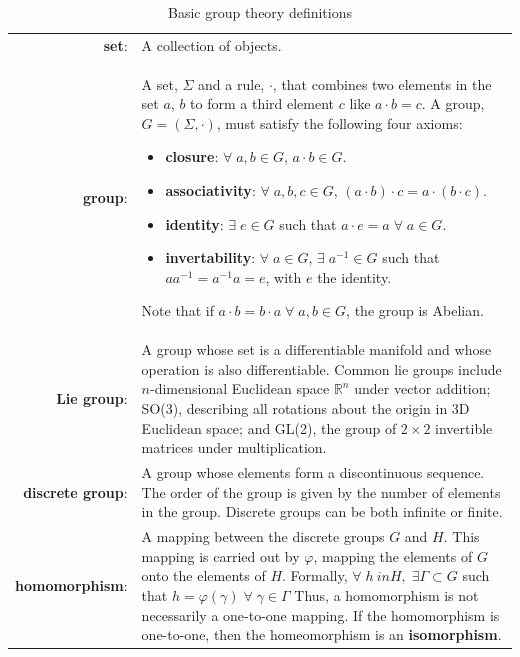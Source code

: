 \begin{table}[t]
  \centering
\caption{Basic group theory definitions}
\begin{tabular}{|r l|}
\hline
{\bf set}:& A collection of objects.\\
{\bf group}:& \begin{minipage}[t]{0.65\textwidth}
A set, $\Sigma$ and a rule, $\cdot$, that combines two elements in the set $a$, $b$ to form a third element $c$ like $a \cdot b=c$. A group, $G = (\Sigma, \cdot)$, must satisfy the following four axioms:
    \begin{itemize}
      \item[]{\bf closure}: $\forall \; a, b \in G$, $a \cdot b \in G$.
      \item[]{\bf associativity}: $\forall \; a,b,c \in G$, $(a \cdot b) \cdot c = a \cdot (b \cdot c)$.
      \item[]{\bf identity}: $\exists \; e \in G$ such that $a\cdot e=a \; \forall \; a \in G$.
      \item[]{\bf invertability}: $\forall \; a \in G$, $\exists \; a^{-1} \in G$ such that $a a^{-1} = a^{-1} a = e$, with $e$ the identity.
    \end{itemize}
    Note that if $a \cdot b = b \cdot a \; \forall \; a,b \in G$, the group is Abelian.
\end{minipage}\\
{\bf Lie group}:& \begin{minipage}[t]{0.65\textwidth}
A group whose set is a differentiable manifold and whose operation is also differentiable. Common lie groups include $n$-dimensional Euclidean space $\mathbb{R}^n$ under vector addition; SO(3), describing all rotations about the origin in 3D Euclidean space; and GL(2), the group of $2 \times 2$ invertible matrices under multiplication.
\end{minipage}\\
{\bf discrete group}:& \begin{minipage}[t]{0.65\textwidth}
A group whose elements form a discontinuous sequence. The order of the group is given by the number of elements in the group. Discrete groups can be both infinite or finite.
\end{minipage}\\
{\bf homomorphism}:& \begin{minipage}[t]{0.65\textwidth}
A mapping between the discrete groups $G$ and $H$. This mapping is carried out by $\varphi$, mapping the elements of $G$ onto the elements of $H$. Formally, $\forall \; h\ in H, \; \exists \Gamma \subset G$ such that $h = \varphi(\gamma) \; \forall \; \gamma \in \Gamma$ Thus, a homomorphism is not necessarily a one-to-one mapping. If the homomorphism is one-to-one, then the homeomorphism is an {\bf isomorphism}.
\end{minipage}\\
\hline
\end{tabular}
\label{t:2-GroupTheory}
\end{table}
